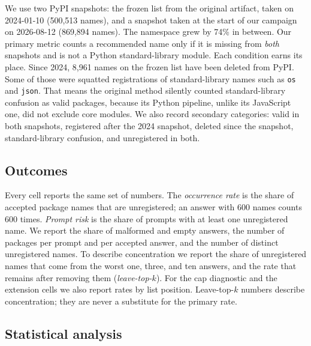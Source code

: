 \documentclass[10pt,twocolumn,letterpaper]{article}
\begin{document}
We use two PyPI snapshots: the frozen list from the original artifact, taken on 2024-01-10 (500,513
names), and a snapshot taken at the start of our campaign on 2026-08-12 (869,894 names). The
namespace grew by 74\% in between. Our primary metric counts a recommended name only if it is missing
from \emph{both} snapshots and is not a Python standard-library module. Each condition earns its
place. Since 2024, 8,961 names on the frozen list have been deleted from PyPI. Some of those were
squatted registrations of standard-library names such as \texttt{os} and \texttt{json}. That means
the original method silently counted standard-library confusion as valid packages, because its Python
pipeline, unlike its JavaScript one, did not exclude core modules. We also record secondary
categories: valid in both snapshots, registered after the 2024 snapshot, deleted since the snapshot,
standard-library confusion, and unregistered in both.

\subsection{Outcomes}

Every cell reports the same set of numbers. The \emph{occurrence rate} is the share of accepted
package names that are unregistered; an answer with 600 names counts 600 times. \emph{Prompt risk}
is the share of prompts with at least one unregistered name. We report the share of malformed and
empty answers, the number of packages per prompt and per accepted answer, and the number of distinct
unregistered names. To describe concentration we report the share of unregistered names that come
from the worst one, three, and ten answers, and the rate that remains after removing them
(\emph{leave-top-$k$}). For the cap diagnostic and the extension cells we also report rates by list
position. Leave-top-$k$ numbers describe concentration; they are never a substitute for the primary
rate.

\subsection{Statistical analysis}
\end{document}
